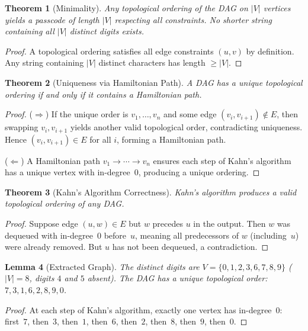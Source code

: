 \documentclass[11pt]{article}
\newtheorem{theorem}{Theorem}
\newtheorem{lemma}[theorem]{Lemma}
\begin{document}
\begin{theorem}[Minimality]
Any topological ordering of the DAG on $|V|$ vertices yields a passcode of length $|V|$ respecting all constraints. No shorter string containing all $|V|$ distinct digits exists.
\end{theorem}

\begin{proof}
A topological ordering satisfies all edge constraints $(u, v)$ by definition. Any string containing $|V|$ distinct characters has length $\geq |V|$.
\end{proof}

\begin{theorem}[Uniqueness via Hamiltonian Path]
A DAG has a unique topological ordering if and only if it contains a Hamiltonian path.
\end{theorem}

\begin{proof}
($\Rightarrow$) If the unique order is $v_1, \ldots, v_n$ and some edge $(v_i, v_{i+1}) \notin E$, then swapping $v_i, v_{i+1}$ yields another valid topological order, contradicting uniqueness. Hence $(v_i, v_{i+1}) \in E$ for all $i$, forming a Hamiltonian path.

($\Leftarrow$) A Hamiltonian path $v_1 \to \cdots \to v_n$ ensures each step of Kahn's algorithm has a unique vertex with in-degree~0, producing a unique ordering.
\end{proof}

\begin{theorem}[Kahn's Algorithm Correctness]
Kahn's algorithm produces a valid topological ordering of any DAG.
\end{theorem}

\begin{proof}
Suppose edge $(u,w) \in E$ but $w$ precedes $u$ in the output. Then $w$ was dequeued with in-degree~0 before~$u$, meaning all predecessors of $w$ (including~$u$) were already removed. But $u$ has not been dequeued, a contradiction.
\end{proof}

\begin{lemma}[Extracted Graph]
The distinct digits are $V = \{0,1,2,3,6,7,8,9\}$ ($|V| = 8$, digits $4$ and $5$ absent). The DAG has a unique topological order: $7, 3, 1, 6, 2, 8, 9, 0$.
\end{lemma}

\begin{proof}
At each step of Kahn's algorithm, exactly one vertex has in-degree~0: first~$7$, then~$3$, then~$1$, then~$6$, then~$2$, then~$8$, then~$9$, then~$0$.
\end{proof}
\end{document}
